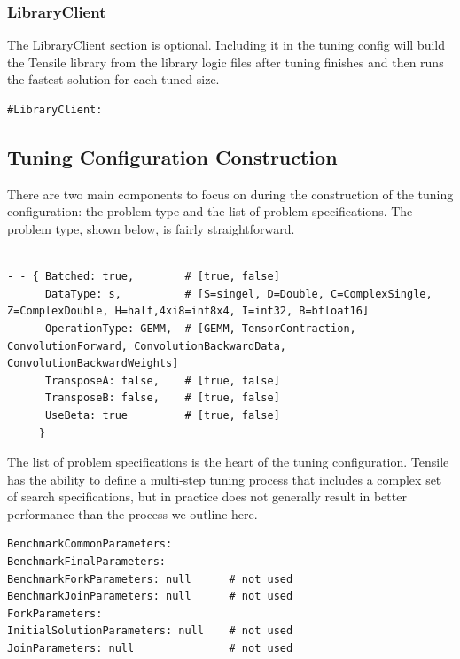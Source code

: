 \documentclass[]{article}
\begin{document}
\subsubsection{LibraryClient}
\label{sec:LibClient}

\noindent
The LibraryClient section is optional. Including it in the tuning config will build the Tensile library from the library logic files after tuning finishes and then runs the fastest solution for each tuned size.

\begin{verbatim}
#LibraryClient:
\end{verbatim}


\subsection{Tuning Configuration Construction}

There are two main components to focus on during the construction of the tuning configuration: the problem type and the list of problem specifications. The problem type, shown below, is fairly straightforward.

\begin{verbatim}

- - { Batched: true,        # [true, false]
      DataType: s,          # [S=singel, D=Double, C=ComplexSingle, Z=ComplexDouble, H=half,4xi8=int8x4, I=int32, B=bfloat16]
      OperationType: GEMM,  # [GEMM, TensorContraction, ConvolutionForward, ConvolutionBackwardData, ConvolutionBackwardWeights]
      TransposeA: false,    # [true, false]
      TransposeB: false,    # [true, false]
      UseBeta: true         # [true, false]
     }

\end{verbatim}

The list of problem specifications is the heart of the tuning configuration. Tensile has the ability to define a multi-step tuning process that includes a complex set of search specifications, but in practice does not generally result in better performance than the process we outline here.
\begin{verbatim}
BenchmarkCommonParameters:
BenchmarkFinalParameters:
BenchmarkForkParameters: null      # not used
BenchmarkJoinParameters: null      # not used
ForkParameters:
InitialSolutionParameters: null    # not used
JoinParameters: null               # not used
\end{verbatim}
\end{document}
